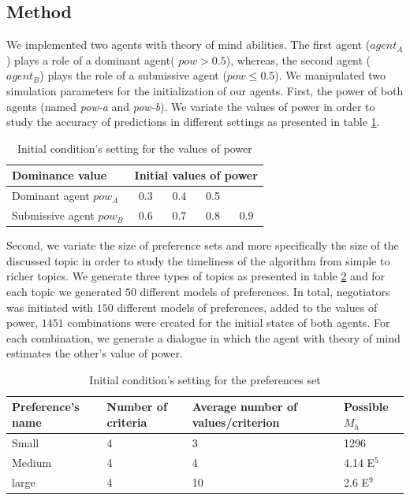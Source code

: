 \documentclass[sigconf]{aamas}  %
\begin{document}
	\subsection{Method}
	We implemented two agents with theory of mind abilities.
	The first agent ($agent_A$) plays a role of a dominant agent( $pow > 0.5$), whereas, the second agent ($agent_B$) plays the role of a submissive agent ($pow \leq 0.5$). 
	We manipulated two simulation parameters for the initialization of our agents. First, the power of both agents (named \emph{pow-a} and \emph{pow-b}). We variate the values of power in order to study the accuracy of predictions in different settings as presented in table \ref{tab:powsettings}.
	\begin{table}[t]
		\centering
		\caption{Initial condition's setting for the values of power} 
		\begin{tabular}{|l|cccc|}
			\hline 
			\textbf{Dominance value } &	\multicolumn{4}{c|}{ Initial values of power } \\
			\hline
			Dominant agent $pow_A$ & 0.3 & 0.4 & 0.5 &  \\
			\hline
			Submissive agent $pow_B$ & 0.6 & 0.7 & 0.8 & 0.9\\
			\hline
		\end{tabular}
		
		\label{tab:powsettings}
	\end{table}
	
	Second, we variate the size of preference sets and more specifically the size of the discussed topic in order to study the timeliness of the algorithm from simple to richer topics. We generate three types of topics as presented in table \ref{tab:initP} and for each topic we generated $50$ different models of preferences. In total, negotiators was initiated with $150$ different models of preferences, added to the values of power,  $1451$ combinations were created for the initial states of both agents. For each combination, we generate a dialogue in which the agent with theory of mind estimates the other's value of power.
	
	
	\begin{table}[]
		\caption{Initial condition's setting for the preferences set} 
		\centering
		\begin{tabular}{|p{1.75cm}|p{1.5cm}|p{1.75cm}|p{1.5cm}|}
			\hline 
			\textbf{Preference's name } & Number of criteria & Average number of values/criterion & Possible $M_h$\\
			\hline
			Small & 4 & 3 & 1296 \\
			\hline
			Medium & 4 & 4 & 4.14 E$^5$ \\
			\hline
			large & 4 & 10 & 2.6 E$^9$ \\
			\hline
		\end{tabular}
		
		\label{tab:initP}
	\end{table}
	
\end{document}
